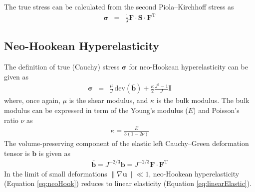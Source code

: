 \documentclass[sn-mathphys,Numbered]{sn-jnl}%
\newcommand{\bb}{\boldsymbol}
\begin{document}
\begin{appendices}
The true stress can be calculated from the second Piola–Kirchhoff stress as
\begin{eqnarray}
	\bb{\sigma} &=& \frac{1}{J} \bb{F} \cdot \bb{S} \cdot \bb{F}^{\text{T}}
\end{eqnarray}



\subsection{Neo-Hookean Hyperelasticity}
The definition of true (Cauchy) stress $\bb{\sigma}$ for neo-Hookean hyperelasticity can be given as
\begin{eqnarray} \label{eq:neoHook}
	\bb{\sigma}
	&=& \frac{\mu}{J} \, \text{dev} \left( \bar{\bb{b}} \right) + \frac{\kappa}{2} \frac{J^2 - 1}{J} \textbf{I}
\end{eqnarray}
where, once again, $\mu$ is the shear modulus, and $\kappa$ is the bulk modulus.
The bulk modulus can be expressed in term of the Young's modulus ($E$) and Poisson's ratio $\nu$ as
\begin{eqnarray}
	\kappa = \frac{E}{3(1 - 2\nu)}
\end{eqnarray}
The volume-preserving component of the elastic left Cauchy--Green deformation tensor is $\boldsymbol{b}$ is given as
\begin{eqnarray}
	\bar{\bb{b}} = J^{-2/3} \bb{b} = J^{-2/3} \bb{F} \cdot \bb{F}^{\text{T}}
\end{eqnarray}
In the limit of small deformations $\lVert \nabla \mathbf{u} \rVert  \ll 1$, neo-Hookean hyperelasticity (Equation \ref{eq:neoHook}) reduces to linear elasticity (Equation \ref{eq:linearElastic}).


\end{appendices}
\end{document}
